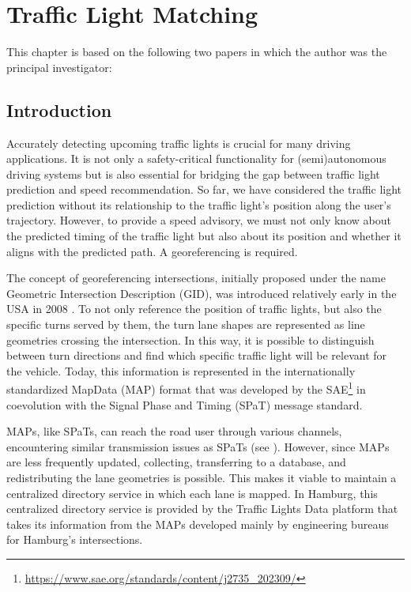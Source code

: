 \chapter{Traffic Light Matching}\label{ch:matching}

\begin{Summary}
This chapter is based on the following two papers in which the author was the principal investigator: 

\cite{matthes2022matching} 

\cite{matthes2023geo} 
\end{Summary}

\section{Introduction}

Accurately detecting upcoming traffic lights is crucial for many driving applications. It is not only a safety-critical functionality for (semi)autonomous driving systems but is also essential for bridging the gap between traffic light prediction and speed recommendation. So far, we have considered the traffic light prediction without its relationship to the traffic light's position along the user's trajectory. However, to provide a speed advisory, we must not only know about the predicted timing of the traffic light but also about its position and whether it aligns with the predicted path. A georeferencing is required.

The concept of georeferencing intersections, initially proposed under the name Geometric Intersection Description (GID), was introduced relatively early in the USA in 2008 \cite{cicas-v}. To not only reference the position of traffic lights, but also the specific turns served by them, the turn lane shapes are represented as line geometries crossing the intersection. In this way, it is possible to distinguish between turn directions and find which specific traffic light will be relevant for the vehicle. Today, this information is represented in the internationally standardized MapData (MAP) format that was developed by the SAE\footnote{\url{https://www.sae.org/standards/content/j2735_202309/}} in coevolution with the Signal Phase and Timing (SPaT) message standard.

MAPs, like SPaTs, can reach the road user through various channels, encountering similar transmission issues as SPaTs (see ). However, since MAPs are less frequently updated, collecting, transferring to a database, and redistributing the lane geometries is possible. This makes it viable to maintain a centralized directory service in which each lane is mapped. In Hamburg, this centralized directory service is provided by the Traffic Lights Data platform that takes its information from the MAPs developed mainly by engineering bureaus for Hamburg's intersections.

